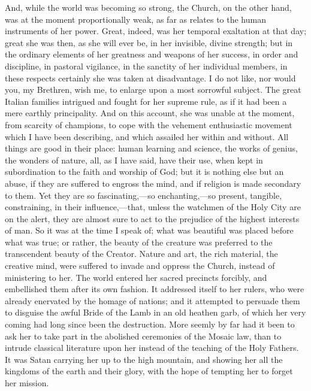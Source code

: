 And, while the world was becoming so strong, the
Church, on the other hand, was at the moment
proportionally weak, as far as relates to the human
instruments of her power. Great, indeed, was her temporal
exaltation at that day; great she was then, as she will
ever be, in her invisible, divine strength; but in the
ordinary elements of her greatness and weapons of her success, in order and discipline, in pastoral vigilance,
in the sanctity of her individual members, in these
respects certainly she was taken at disadvantage. I do
not like, nor would you, my Brethren, wish me, to enlarge
upon a most sorrowful subject. The great Italian families
intrigued and fought for her supreme rule, as if it had
been a mere earthly principality. And on this account,
she was unable at the moment, from scarcity of champions,
to cope with the vehement enthusiastic movement which I
have been describing, and which assailed her within and
without. All things are good in their place: human
learning and science, the works of genius, the wonders of
nature, all, as I have said, have their use, when kept in
subordination to the faith and worship of God; but it is
nothing else but an abuse, if they are suffered to
engross the mind, and if religion is made secondary to
them. Yet they are so fascinating,—so
enchanting,—so present, tangible, constraining, in
their influence,—that, unless the watchmen of the
Holy City are on the alert, they are almost sure to act
to the prejudice of the highest interests of man. So it
was at the time I speak of; what was beautiful was placed
before what was true; or rather, the beauty of the
creature was preferred to the transcendent beauty of the
Creator. Nature and art, the rich material, the creative
mind, were suffered to invade and oppress the Church,
instead of ministering to her. The world entered her
sacred precincts forcibly, and embellished them after its
own fashion. It addressed itself to her rulers, who were
already enervated by the homage of nations; and it
attempted to persuade them to disguise the awful Bride of
the Lamb in an old heathen garb, of which her very coming
had long since been the destruction. More seemly by far
had it been to ask her to take part in the abolished
ceremonies of the Mosaic law, than to intrude classical
literature upon her instead of the teaching of the Holy
Fathers. It was Satan carrying her up to the high
mountain, and showing her all the kingdoms of the earth
and their glory, with the hope of tempting her to forget
her mission.

